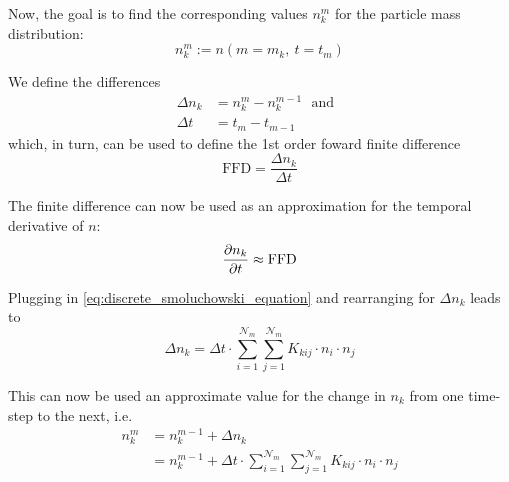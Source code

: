         Now, the goal is to find the corresponding values $n_k^m$ for the particle mass 
        distribution:
        \begin{equation}
            n_k^m
                :=n(m=m_k,\ t=t_m)
        \end{equation}
        
        We define the differences
        \begin{align}
            \Delta n_k
                &=n_k^m-n_k^{m-1}
            \ \ \ \text{and}\ \ \
            \\
            \Delta t
                &=t_m-t_{m-1}
        \end{align}
        which, in turn, can be used to define the 1st order foward finite difference
        \begin{equation}
            \text{FFD}
                =\frac{\Delta n_k}{\Delta t}
        \end{equation}
        
        The finite difference can now be used as an approximation for the temporal derivative 
        of $n$:
        \begin{equation}
            \frac{\partial n_k}{\partial t}
                \approx\text{FFD}
        \end{equation}
        
        Plugging in \cref{eq:discrete_smoluchowski_equation} and rearranging for $\Delta n_k$ 
        leads to
        \begin{equation}
            \Delta n_k
            =\Delta t\cdot
                \sum_{i=1}^{\mathcal N_m}\sum_{j=1}^{\mathcal N_m}
                K_{kij}\cdot n_i\cdot n_j
        \end{equation}
        
        This can now be used an approximate value for the change in $n_k$ from one time-step to 
        the next, i.e.
        \begin{equation}
            \begin{split}
                n_k^m
                    &=n_k^{m-1}+\Delta n_k
                \\
                    &=n_k^{m-1}+\Delta t\cdot
                        \sum_{i=1}^{\mathcal N_m}\sum_{j=1}^{\mathcal N_m}
                        K_{kij}\cdot n_i\cdot n_j
            \end{split}
        \end{equation}
        
